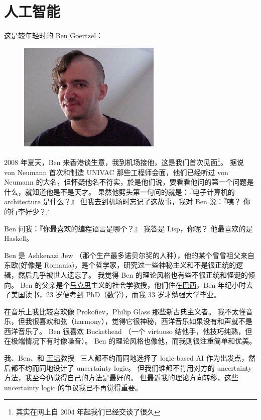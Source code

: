 \documentclass[12pt]{report}
\begin{document}
\chapter{人工智能}

这是较年轻时的 Ben Goertzel：
\begin{figure}[H]
\centering
\includegraphics[scale=2.5]{benbenben.jpg}
\end{figure}

2008 年夏天，Ben 来香港谈生意，我到机场接他，这是我们首次见面\footnote{其实在网上自 2004 年起我们已经交谈了很久}。 据说 von Neumann 首次和制造 UNIVAC 那些工程师会面，他们已经听过 von Neumann 的大名，但怀疑他名不符实，於是他们说，要看看他问的第一个问题是什么，就知道他是不是天才。  果然他劈头第一句问的就是：『电子计算机的 architecture 是什么？』  但我去到机场时忘记了这故事，我对 Ben 说：『咦？ 你的行李好少？』

Ben 问我：『你最喜欢的编程语言是哪个？』 我答是 Lisp，你呢？ 他最喜欢的是 Haskell。

Ben 是 Ashkenazi Jew （那个生产最多诺贝尔奖的人种），他的某个曾曾祖父来自东欧(好像是 Romania)，是个哲学家，研究过一些神秘主义和不是很正统的逻辑，然后几乎被世人遗忘了。 我觉得 Ben 的理论风格也有些不很正统和怪诞的倾向。  Ben 的父亲是个\underline{马克思}主义的社会学教授，他们住在\underline{巴西}，Ben 年纪小时去了\underline{美国}读书，23 岁便考到 PhD（数学），而我 33 岁才勉强大学毕业。

在音乐上我比较喜欢像 Prokofiev，Philip Glass 那些新古典主义者。 我不太懂音乐，但我很喜欢和弦（harmony），觉得它很神秘，西洋音乐如果没有和声就不是西洋音乐了。 Ben 很喜欢 Buckethead （一个 virtuoso 结他手，他技巧纯熟，但在极端情况下有时像噪音）。 Ben 的理论风格也像他，而我则很注重简单和优美。

我、Ben、和 \underline{王培}教授 ~三人都不约而同地选择了 logic-based AI 作为出发点，然后都不约而同地设计了 uncertainty logic。  但我们谁都不肯用对方的 uncertainty 方法，我至今仍觉得自己的方法是最好的。 但最近我的理论方向转移，这些 uncertainty logic 的争议我已不再觉得重要。
\end{document}
